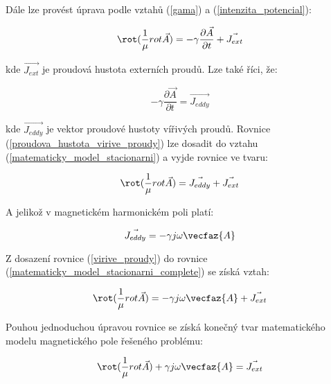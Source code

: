 Dále lze provést úprava podle vztahů (\ref{gama}) a (\ref{intenzita_potencial}):

\begin{equation}
	\rot (\frac{1}{\mu} {rot \vec{A}}) = - \gamma \frac{\partial \vec{A}}{\partial t} + \vec{J_{ext}}
	\label{matematicky_model_stacionarni}
\end{equation}

kde $\vec{J_{ext}}$ je proudová hustota externích proudů. Lze také říci, že:

\begin{equation}
	- \gamma \frac{\partial \vec{A}}{\partial t} = \vec{J_{eddy}}
	\label{proudova_hustota_virive_proudy}
\end{equation}

kde $\vec{J_{eddy}}$ je vektor proudové hustoty vířivých proudů. Rovnice (\ref{proudova_hustota_virive_proudy}) lze dosadit do vztahu (\ref{matematicky_model_stacionarni}) a vyjde rovnice ve tvaru:

\begin{equation}
	\rot (\frac{1}{\mu} {rot \vec{A}}) = \vec{J_{eddy}} + \vec{J_{ext}}
	\label{matematicky_model_stacionarni_complete}
\end{equation}

A jelikož v magnetickém harmonickém poli platí:

\begin{equation}
	\vec{J_{eddy}} = - \gamma j \omega \vecfaz{A}
	\label{virive_proudy}
\end{equation}

Z dosazení rovnice (\ref{virive_proudy}) do rovnice (\ref{matematicky_model_stacionarni_complete}) se získá vztah:

\begin{equation}
	\rot (\frac{1}{\mu} {rot \vec{A}}) = - \gamma j \omega \vecfaz{A} + \vec{J_{ext}}
\end{equation}

Pouhou jednoduchou úpravou rovnice se získá konečný tvar matematického modelu magnetického pole řešeného problému:

\begin{equation}
	\rot (\frac{1}{\mu} {rot \vec{A}}) + \gamma j \omega \vecfaz{A} = \vec{J_{ext}}
	\label{matematicky_model_magneticke_pole}
\end{equation}